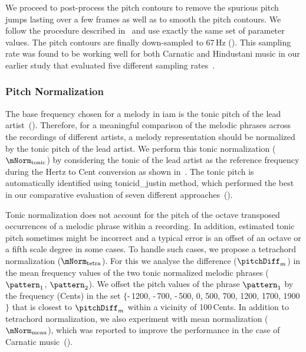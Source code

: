We proceed to post-process the pitch contours to remove the spurious pitch jumps lasting over a few frames as well as to smooth the pitch contours. We follow the procedure described in~ and use exactly the same set of parameter values. The pitch contours are finally down-sampled to 67\,Hz (). This sampling rate was found to be working well for both Carnatic and Hindustani music in our earlier study that evaluated five different sampling rates~.


\subsubsection{Pitch Normalization}
\label{sec:patterns_improving_similarity_transposition_invariance}

The base frequency chosen for a melody in \gls{iam} is the tonic pitch of the lead artist~(). Therefore, for a meaningful comparison of the melodic phrases across the recordings of different artists, a melody representation should be normalized by the tonic pitch of the lead artist. We perform this tonic normalization ($\mNorm_\mathrm{tonic}$) by considering the tonic of the lead artist as the reference frequency during the Hertz to Cent conversion as shown in~. The tonic pitch is automatically identified using \acrshort{tonicid_justin} method, which performed the best in our comparative evaluation of seven different approaches~().

Tonic normalization does not account for the pitch of the octave transposed occurrences of a melodic phrase within a recording. In addition, estimated tonic pitch sometimes might be incorrect and a typical error is an offset of an octave or a fifth scale degree in some cases. To handle such cases, we propose a tetrachord normalization ($\mNorm_\mathrm{tetra}$). For this we analyse the difference ($\pitchDiff_m$) in the mean frequency values of the two tonic normalized melodic phrases ($\pattern_1$, $\pattern_2$). We offset the pitch values of the phrase $\pattern_1$ by the frequency (Cents) in the set $\lbrace$-\,1200, -\,700, -\,500, 0, 500, 700, 1200, 1700, 1900$\rbrace$ that is closest to $\pitchDiff_m$ within a vicinity of 100\,Cents. In addition to tetrachord normalization, we also experiment with mean normalization ($\mNorm_\mathrm{mean}$), which was reported to improve the performance in the case of Carnatic music~(). 


